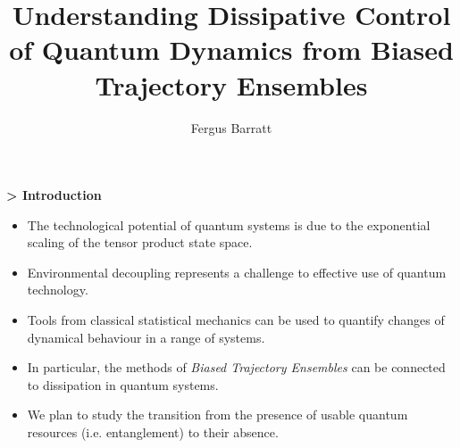 \documentclass[a0,portrait]{a0poster}
\title{Understanding Dissipative Control of Quantum Dynamics from Biased Trajectory Ensembles}
\author{Fergus Barratt}
\newenvironment{Section}[1]				%
{
\par 
\flushleft
\colorbox{boxcol}{%
\sffamily\large\bf\color{headingcol}> \color{white} #1%
\hspace{0.5cm}}
\par\nobreak 
\nointerlineskip 						%
\setlength\parskip{-1pt}					%
\begin{lrbox}\envbox						%
\begin{minipage}{0.95\columnwidth}		%
}
{\par
\end{minipage}\end{lrbox}				%
\fcolorbox{boxcol}{fillcol}{\usebox\envbox}	%
\vspace{1cm}							%
}
\begin{document}
\hspace{-4.1cm}								%
\colorbox{boxcol}{							%
\begin{minipage}{1189mm}					%
\maketitle
\end{minipage}}
\vspace{1cm}

\begin{multicols}{3}							%
\raggedcolumns							%

\begin{Section}{Introduction}
\begin{itemize}
    \item The technological potential of quantum systems is due to the exponential scaling of the tensor product state space.
    \item Environmental decoupling represents a challenge to effective use of quantum technology.
    \item Tools from classical statistical mechanics can be used to quantify changes of dynamical behaviour in a range of systems.
    \item In particular, the methods of \emph{Biased Trajectory Ensembles} can be connected to dissipation in quantum systems. 
    \item We plan to study the transition from the presence of usable quantum resources (i.e. entanglement) to their absence.
\end{itemize}
\end{Section}


\end{multicols}
\end{document}
